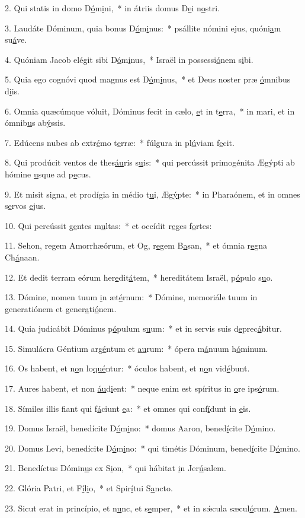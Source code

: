 2. Qui statis in domo D\uline{ó}m\uline{i}ni,~* in átriis domus D\uline{e}i n\uline{o}stri.\par 
3. Laudáte Dóminum, quia bonus D\uline{ó}m\uline{i}nus:~* psállite nómini ejus, quóni\uline{a}m su\uline{á}ve.\par 
4. Quóniam Jacob elégit sibi D\uline{ó}m\uline{i}nus,~* Israël in possessi\uline{ó}nem s\uline{i}bi.\par 
5. Quia ego cognóvi quod magnus est D\uline{ó}m\uline{i}nus,~* et Deus noster præ \uline{ó}mnibus d\uline{i}is.\par 
6. Omnia quæcúmque vóluit, Dóminus fecit in cælo, \uline{e}t in t\uline{e}rra,~* in mari, et in ómnib\uline{u}s ab\uline{ý}ssis.\par 
7. Edúcens nubes ab extr\uline{é}mo t\uline{e}rræ:~* fúlgura in pl\uline{ú}viam f\uline{e}cit.\par 
8. Qui prodúcit ventos de thes\uline{áu}ris s\uline{u}is:~* qui percússit primogénita Ægýpti ab hómine \uline{u}sque ad p\uline{e}cus.\par 
9. Et misit signa, et prodígia in médio t\uline{u}i, Æg\uline{ý}pte:~* in Pharaónem, et in omnes s\uline{e}rvos \uline{e}jus.\par 
10. Qui percússit g\uline{e}ntes m\uline{u}ltas:~* et occídit r\uline{e}ges f\uline{o}rtes:\par 
11. Sehon, regem Amorrhæórum, et Og, r\uline{e}gem B\uline{a}san,~* et ómnia r\uline{e}gna Ch\uline{á}naan.\par 
12. Et dedit terram eórum her\uline{e}dit\uline{á}tem,~* hereditátem Israël, p\uline{ó}pulo s\uline{u}o.\par 
13. Dómine, nomen tuum \uline{i}n æt\uline{é}rnum:~* Dómine, memoriále tuum in generatiónem et gener\uline{a}ti\uline{ó}nem.\par 
14. Quia judicábit Dóminus p\uline{ó}pulum s\uline{u}um:~* et in servis suis d\uline{e}prec\uline{á}bitur.\par 
15. Simulácra Géntium arg\uline{é}ntum et \uline{au}rum:~* ópera m\uline{á}nuum h\uline{ó}minum.\par 
16. Os habent, et n\uline{o}n lo\uline{qué}ntur:~* óculos habent, et n\uline{o}n vid\uline{é}bunt.\par 
17. Aures habent, et non \uline{áu}d\uline{i}ent:~* neque enim est spíritus in \uline{o}re ips\uline{ó}rum.\par 
18. Símiles illis fiant qui f\uline{á}ciunt \uline{e}a:~* et omnes qui conf\uline{í}dunt in \uline{e}is.\par 
19. Domus Israël, benedícite D\uline{ó}m\uline{i}no:~* domus Aaron, bened\uline{í}cite D\uline{ó}mino.\par 
20. Domus Levi, benedícite D\uline{ó}m\uline{i}no:~* qui timétis Dóminum, bened\uline{í}cite D\uline{ó}mino.\par 
21. Benedíctus Dómin\uline{u}s ex S\uline{i}on,~* qui hábitat \uline{i}n Jer\uline{ú}salem.\par 
22. Glória Patri, et F\uline{í}l\uline{i}o,~* et Spir\uline{í}tui S\uline{a}ncto.\par 
23. Sicut erat in princípio, et n\uline{u}nc, et s\uline{e}mper,~* et in sǽcula sæcul\uline{ó}rum. \uline{A}men.\par 

